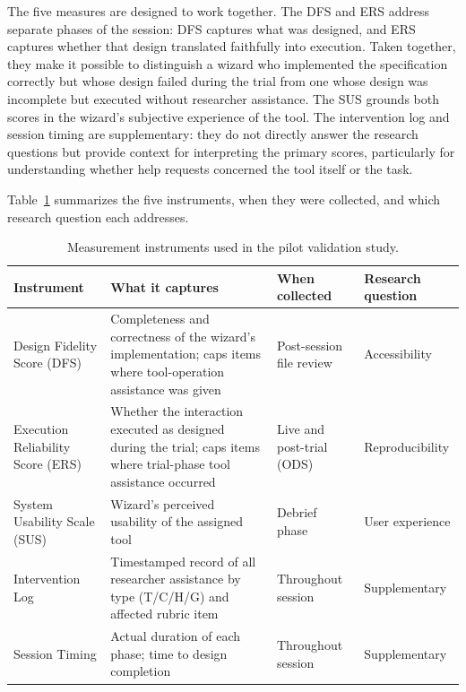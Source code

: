 The five measures are designed to work together. The DFS and ERS address separate phases of the session: DFS captures what was designed, and ERS captures whether that design translated faithfully into execution. Taken together, they make it possible to distinguish a wizard who implemented the specification correctly but whose design failed during the trial from one whose design was incomplete but executed without researcher assistance. The SUS grounds both scores in the wizard's subjective experience of the tool. The intervention log and session timing are supplementary: they do not directly answer the research questions but provide context for interpreting the primary scores, particularly for understanding whether help requests concerned the tool itself or the task.

Table~\ref{tbl:measurement_instruments} summarizes the five instruments, when they were collected, and which research question each addresses.

\begin{table}[htbp]
\centering
\footnotesize
\begin{tabular}{|p{3.0cm}|p{4.4cm}|p{2.4cm}|p{2.8cm}|}
\hline
\textbf{Instrument} & \textbf{What it captures} & \textbf{When collected} & \textbf{Research question} \\
\hline
Design Fidelity Score (DFS) & Completeness and correctness of the wizard's implementation; caps items where tool-operation assistance was given & Post-session file review & Accessibility \\
\hline
Execution Reliability Score (ERS) & Whether the interaction executed as designed during the trial; caps items where trial-phase tool assistance occurred & Live and post-trial (ODS) & Reproducibility \\
\hline
System Usability Scale (SUS) & Wizard's perceived usability of the assigned tool & Debrief phase & User experience \\
\hline
Intervention Log & Timestamped record of all researcher assistance by type (T/C/H/G) and affected rubric item & Throughout session & Supplementary \\
\hline
Session Timing & Actual duration of each phase; time to design completion & Throughout session & Supplementary \\
\hline
\end{tabular}
\caption{Measurement instruments used in the pilot validation study.}
\label{tbl:measurement_instruments}
\end{table}

